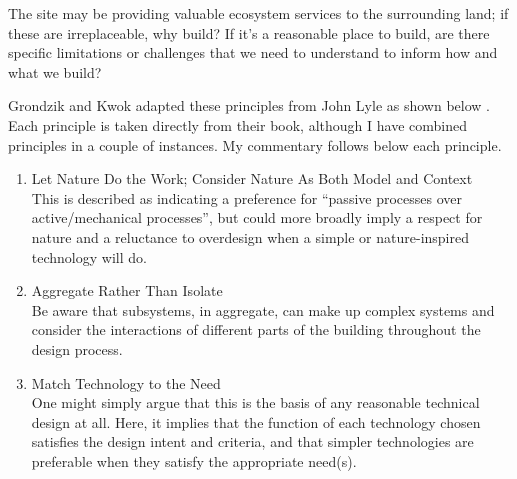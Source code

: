 \documentclass[10pt]{article}
\begin{document}
The site may be providing valuable ecosystem services to the surrounding land; if these are irreplaceable, why build? If it's a reasonable place to build, are there specific limitations or challenges that we need to understand to inform how and what we build?

Grondzik and Kwok adapted these principles from John Lyle as shown below \cite{Grondzik2014-gt}. Each principle is taken directly from their book, although I have combined principles in a couple of instances. My commentary follows below each principle.

\begin{enumerate}
    \item Let Nature Do the Work; Consider Nature As Both Model and Context\\
    This is described as indicating a preference for ``passive processes over active/mechanical processes'', but could more broadly imply a respect for nature and a reluctance to overdesign when a simple or nature-inspired technology will do.

      \item Aggregate Rather Than Isolate\\ Be aware that subsystems, in aggregate, can make up complex systems and consider the interactions of different parts of the building throughout the design process.
      \item Match Technology to the Need\\ One might simply argue that this is the basis of any reasonable technical design at all. Here, it implies that the function of each technology chosen satisfies the design intent and criteria, and that simpler technologies are preferable when they satisfy the appropriate need(s).
     

\end{enumerate}
\end{document}
